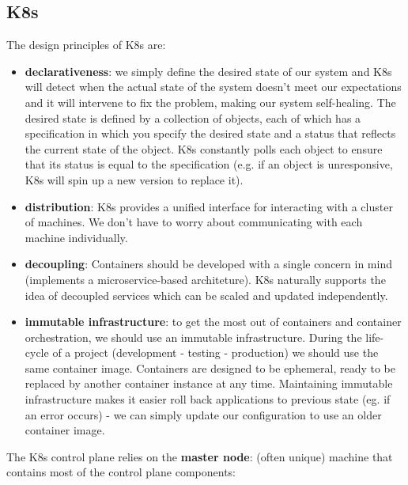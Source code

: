 \subsection{K8s}
The design principles of K8s are:
\begin{itemize}
   \item \textbf{declarativeness}: we simply define the desired state of our system and K8s will detect when the actual state of the system doesn't meet our expectations and it will intervene to fix the problem, making our system self-healing. The desired state is defined by a collection of objects, each of which has a specification in which you specify the desired state and a status that reflects the current state of the object. K8s constantly polls each object to ensure that its status is equal to the specification (e.g. if an object is unresponsive, K8s will spin up a new version to replace it).
   \item \textbf{distribution}: K8s provides a unified interface for interacting with a cluster of machines. We don't have to worry about communicating with each machine individually.
   \item \textbf{decoupling}: Containers should be developed with a single concern in mind (implements a microservice-based architeture). K8s naturally supports the idea of decoupled services which can be scaled and updated independently.
   \item \textbf{immutable infrastructure}: to get the most out of containers and container orchestration, we should use an immutable infrastructure. During the life-cycle of a project (development - testing - production) we should use the same container image. Containers are designed to be ephemeral, ready to be replaced by another container instance at any time. Maintaining immutable infrastructure makes it easier roll back applications to previous state (eg. if an error occurs) - we can simply update our configuration to use an older container image.
\end{itemize}
The K8s control plane relies on the \textbf{master node}: (often unique) machine that contains most of the control plane components:
